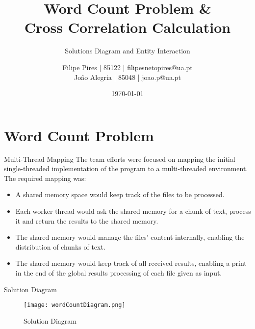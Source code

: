 \documentclass{beamer}
\title{Word Count Problem \& \\Cross Correlation Calculation}
\subtitle{Solutions Diagram and Entity Interaction}
\author{Filipe Pires | 85122 | filipesnetopires@ua.pt \\ João Alegria | 85048 | joao.p@ua.pt}
\institute{University of Aveiro, DETI}
\date{\today}
\begin{document}

\begin{frame}
	\maketitle %
\end{frame}


\section{Word Count Problem}


\begin{frame}{Multi-Thread Mapping}
	The team efforts were focused on mapping the initial single-threaded implementation of the program to a multi-threaded environment.
	The required mapping was:
	\begin{itemize}
		\item A shared memory space would keep track of the files to be processed.
		\item Each worker thread would ask the shared memory for a chunk of text, process it and return the results to the shared memory.
		\item The shared memory would manage the files' content internally, enabling the distribution of chunks of text.
		\item The shared memory would keep track of all received results, enabling a print in the end of the global results processing of each file given as input.
	\end{itemize}
\end{frame}


\begin{frame}{Solution Diagram}
	\begin{figure}
		\texttt{[image: wordCountDiagram.png]}
		\caption{Solution Diagram}
		\label{wordDiagram}
	\end{figure}
\end{frame}

\end{document}
